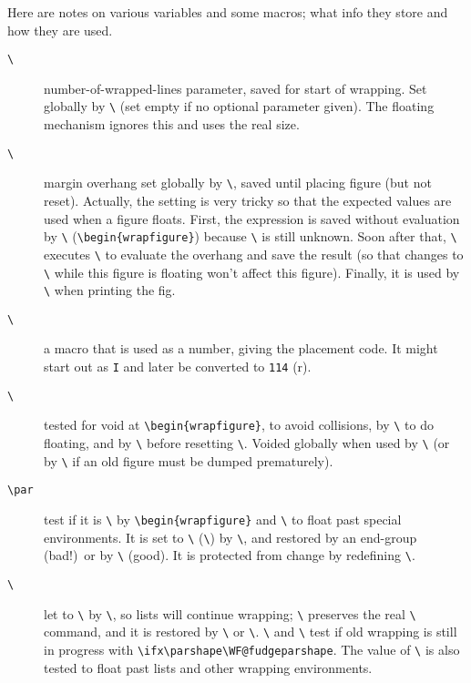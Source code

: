 \documentclass[pagesize=auto]{scrartcl}
\makeatletter
\newcommand*{\cs}[1]{\texttt{\textbackslash#1}}
\newcommand*{\cmd}[1]{\cs{\expandafter\@gobble\string#1}}
\makeatother
\begin{document}
Here are notes on various variables and some macros; what info they
store and how they are used.
%
\begin{description}
\item[\cmd{\WF@wli}] number-of-wrapped-lines parameter, saved for start of wrapping.
  Set globally by \cmd{\WF@wr} (set empty if no optional parameter given).
  The floating mechanism ignores this and uses the real size.

\item[\cmd{\WF@ovh}] margin overhang set globally by \cmd{\WF@rapt}, saved until placing
  figure (but not reset).  Actually, the setting is very tricky so that
  the expected values are used when a figure floats. First, the expression
  is saved without evaluation by \cmd{\WF@rapt} (\verb+\begin{wrapfigure}+) because
  \cmd{\width} is still unknown.  Soon after that, \cmd{\endwrapfigure} executes
  \cmd{\WF@ovh} to evaluate the overhang and save the result (so that changes
  to \cmd{\wrapoverhang} while this figure is floating won't affect this
  figure). Finally, it is used by \cmd{\WF@putfigmaybe} when printing the fig.

\item[\cmd{\WF@place}] a macro that is used as a number, giving the placement code.
  It might start out as \texttt{\textasciigrave I} and later be converted to \texttt{114} (r).

\item[\cmd{\WF@box}] tested for void at \verb+\begin{wrapfigure}+, to avoid collisions, %
  by \cmd{\everypar} to do floating, and by \cmd{\WF@finale} before resetting
  \cmd{\everypar}.  Voided globally when used by \cmd{\WF@putfigmaybe} (or by
  \cmd{\WF@wr} if an old figure must be dumped prematurely).

\item[\cs{par}] test if it is \cmd{\@@par} by \verb+\begin{wrapfigure}+ and \cmd{\WF@floathand} %
  to float past special environments.  It is set to \cmd{\@par} (\cmd{\WF@mypar})
  by \cmd{\WF@startwrapping}, and restored by an end-group (bad!)\ or by
  \cmd{\WF@finale} (good).  It is protected from change by redefining
  \cmd{\@setpar}.

\item[\cmd{\parshape}] let to \cmd{\WF@fudgeparshape} by \cmd{\WF@startwrapping}, so lists
  will continue wrapping; \cmd{\@@parshape} preserves the real \cmd{\parshape}
  command, and it is restored by \cmd{\WF@finale} or \cmd{\@parboxrestore}.
  \cmd{\WF@floathand} and \cmd{\WF@wr} test if old wrapping is still in progress
  with \verb+\ifx\parshape\WF@fudgeparshape+. The value of \cmd{\@@parshape} is
  also tested to float past lists and other wrapping environments.


\end{description}
\end{document}
